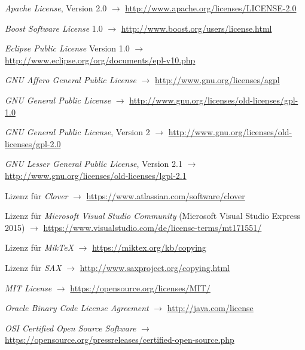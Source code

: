 \documentclass[english,ngerman,parskip=half,headsepline,footsepline]{scrreprt}
\begin{document}
   	\begin{flushleft}
		\begin{thebibliography}{12}
			\ihead{\textnormal{\textsf{\textbf{\bibname}}}}
			\thispagestyle{scrheadings}

			\emph{Apache License}, Version 2.0 $\rightarrow$ \url{http://www.apache.org/licenses/LICENSE-2.0}

			\emph{Boost Software License} 1.0 $\rightarrow$ \url{http://www.boost.org/users/license.html}

			\emph{Eclipse Public License} Version 1.0 $\rightarrow$ \url{http://www.eclipse.org/org/documents/epl-v10.php}

			\emph{GNU Affero General Public License} $\rightarrow$ \url{http://www.gnu.org/licenses/agpl}

			\emph{GNU General Public License} $\rightarrow$ \url{http://www.gnu.org/licenses/old-licenses/gpl-1.0}

			\emph{GNU General Public License}, Version 2 $\rightarrow$ \url{http://www.gnu.org/licenses/old-licenses/gpl-2.0}

			\emph{GNU Lesser General Public License}, Version 2.1 $\rightarrow$ \url{http://www.gnu.org/licenses/old-licenses/lgpl-2.1}

			Lizenz für \emph{Clover} $\rightarrow$ \url{https://www.atlassian.com/software/clover}

			Lizenz für \emph{Microsoft Visual Studio Community} (Microsoft Visual Studio Express 2015) $\rightarrow$ \url{https://www.visualstudio.com/de/license-terms/mt171551/}

			Lizenz für \emph{MikTeX} $\rightarrow$ \url{https://miktex.org/kb/copying}

			Lizenz für \emph{SAX} $\rightarrow$ \url{http://www.saxproject.org/copying.html}

			\emph{MIT License} $\rightarrow$ \url{https://opensource.org/licenses/MIT/}

			\emph{Oracle Binary Code License Agreement} $\rightarrow$ \url{http://java.com/license}

			\emph{OSI Certified Open Source Software} $\rightarrow$ \url{https://opensource.org/pressreleases/certified-open-source.php}


\end{thebibliography}
\end{flushleft}
\end{document}
